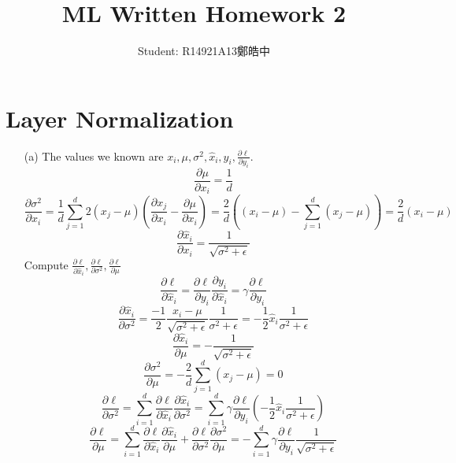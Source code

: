 \documentclass[12pt,a4paper]{article}
\title{ML Written Homework 2}
\author{Student: R14921A13鄭皓中}
\begin{document}
\maketitle

\section{Layer Normalization}

\begin{enumerate}
    \item [(a)] 
        The values we known are $x_{i}, \mu, \sigma^{2}, \hat{x}_{i}, y_i, \frac{\partial \ell}{\partial y_{i}}$.
        \[
            \frac{\partial \mu}{\partial x_{i}} = \frac{1}{d}
        \]
        \[
            \frac{\partial \sigma^{2}}{\partial x_{i}} = \frac{1}{d} \sum_{j=1}^{d} 2(x_{j} - \mu)(\frac{\partial x_{j}}{\partial x_{i}} - \frac{\partial \mu}{\partial x_{i}}) = \frac{2}{d} ((x_{i}- \mu) - \sum_{j=1}^{d} (x_j - \mu)) = \frac{2}{d} (x_{i}- \mu)
        \]
        \[
            \frac{\partial \hat{x}_i}{\partial x_{i}} = \frac{1}{\sqrt{\sigma^{2}+\epsilon}}
        \]
        Compute $\frac{\partial \ell}{\partial \hat{x}_{i}}, \frac{\partial \ell}{\partial \sigma^{2}}, \frac{\partial \ell}{\partial \mu}$
        \[
            \frac{\partial \ell}{\partial \hat{x}_{i}} = \frac{\partial \ell}{\partial y_{i}} \frac{\partial y_{i}}{\partial \hat{x}_{i}} = \gamma \frac{\partial \ell}{\partial y_{i}}
        \]
        \[
            \frac{\partial \hat{x}_{i}}{\partial \sigma^{2}} = \frac{-1}{2} \frac{x_{i} - \mu}{\sqrt{\sigma^{2}+\epsilon}} \frac{1}{\sigma^{2} +\epsilon} = -\frac{1}{2}\hat{x}_{i}\frac{1}{\sigma^{2}+\epsilon}
        \]
        \[
            \frac{\partial \hat{x}_{i}}{\partial \mu} = -\frac{1}{\sqrt{\sigma^{2}+\epsilon}}
        \]
        \[
            \frac{\partial \sigma^{2}}{\partial \mu} = -\frac{2}{d}\sum_{j=1}^{d}(x_{j}-\mu) = 0
        \]
        \[
            \frac{\partial \ell}{\partial \sigma^{2}} = \sum_{i=1}^{d} \frac{\partial \ell}{\partial \hat{x}_{i}} \frac{\partial \hat{x}_{i}}{\partial \sigma^{2}} = \sum_{i=1}^{d} \gamma \frac{\partial \ell}{\partial y_{i}}(-\frac{1}{2}\hat{x}_{i}\frac{1}{\sigma^{2}+\epsilon})
        \]
        \[
            \frac{\partial \ell}{\partial \mu} = \sum_{i=1}^{d} \frac{\partial \ell}{\partial \hat{x}_{i}}\frac{\partial \hat{x}_{i}}{\partial \mu} + \frac{\partial \ell}{\partial \sigma^{2}}\frac{\partial \sigma^{2}}{\partial \mu} = -\sum_{i=1}^{d} \gamma \frac{\partial \ell}{\partial y_{i}}\frac{1}{\sqrt{\sigma^{2}+\epsilon}}
\]
\end{enumerate}
\end{document}
